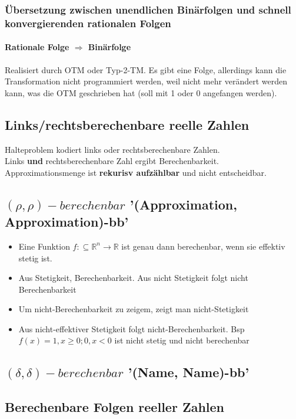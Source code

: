 \documentclass[ngerman]{scrartcl}
\begin{document}
\subsubsection{Übersetzung zwischen unendlichen Binärfolgen und schnell konvergierenden rationalen Folgen}
\paragraph{Rationale Folge $ \Rightarrow $ Binärfolge}
Realisiert durch OTM oder Typ-2-TM. Es gibt eine Folge, allerdings kann die Transformation nicht programmiert werden, weil nicht mehr verändert werden kann, was die OTM geschrieben hat (soll mit 1 oder 0 angefangen werden).


\subsection{Links/rechtsberechenbare reelle Zahlen}
Halteproblem kodiert links oder rechtsberechenbare Zahlen. \\
Links \textbf{und} rechtsberechenbare Zahl ergibt Berechenbarkeit. Approximationsmenge ist \textbf{rekurisv aufzählbar} und nicht entscheidbar.


\subsection{$ (\rho, \rho)-berechenbar $ '(Approximation, Approximation)-bb'}
\begin{itemize}
  \item Eine Funktion $ f: \subseteq \mathbb{R}^n \rightarrow \mathbb{R} $ ist genau dann berechenbar, wenn sie effektiv stetig ist.
  \item Aus Stetigkeit, Berechenbarkeit. Aus nicht Stetigkeit folgt nicht Berechenbarkeit
  \item Um nicht-Berechenbarkeit zu zeigem, zeigt man nicht-Stetigkeit 
  \item Aus nicht-effektiver Stetigkeit folgt nicht-Berechenbarkeit. Bsp $  f(x) = 1, x \geq 0; 0, x < 0 $ ist nicht stetig und nicht berechenbar
\end{itemize}

\subsection{$ (\delta, \delta)-berechenbar $ '(Name, Name)-bb'}

\subsection{Berechenbare Folgen reeller Zahlen}
\end{document}
